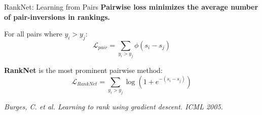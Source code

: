 \documentclass[aspectratio=169]{beamer}
\begin{document}
\begin{frame}{RankNet: Learning from Pairs}
\textbf{Pairwise loss minimizes the average number of pair-inversions in rankings.}

\vspace{0.8em}
For all pairs where $y_i > y_j$:
\[
\mathcal{L}_{pair} = \sum_{y_i > y_j} \phi(s_i - s_j)
\]

\vspace{0.8em}
\textbf{RankNet} is the most prominent pairwise method:
\[
\mathcal{L}_{RankNet} = \sum_{y_i > y_j} \log(1 + e^{-(s_i - s_j)})
\]

\vfill
\footnotesize \textit{Burges, C. et al. Learning to rank using gradient descent. ICML 2005.}
\end{frame}

\end{document}
